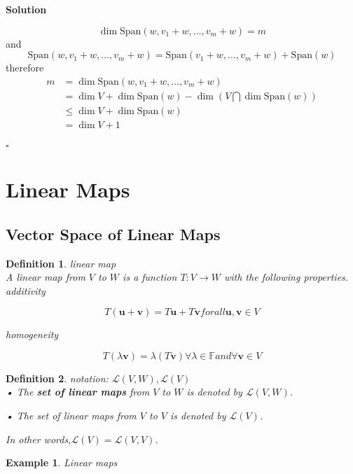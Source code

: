 \documentclass{article}
\newtheorem{example}{Example}[subsection]
\newtheorem{definition}{Definition}[subsection]
\newenvironment{solution}{%
{
    \textbf{Solution\\}
    }
}{
  \hfill $\square$ 
  \par\bigskip 
}
\newcommand{\FF}{\mathbb{F}}
\newcommand{\parameter}[1]{\left(#1\right)}
\newcommand{\ve}{\boldsymbol}
\newcommand{\spans}{\text{Span}}
\begin{document}
\begin{CJK}{UTF8}{gkai}
\begin{solution}
\[\dim \spans(w,v_1 + w,\ldots,v_m + w) = m\]
and
\[\spans(w,v_1 + w,\ldots,v_m + w) = \spans(v_1 + w,\ldots,v_m + w) + \spans(w)\]
therefore
\[
\begin{aligned}  
    m &= \dim \spans(w,v_1 + w,\ldots,v_m + w)\\ 
    &= \dim V + \dim\spans(w) - \dim \parameter{V \bigcap \dim\spans(w)}\\
    &\leq \dim V + \dim\spans(w) \\
    &= \dim V + 1\\
\end{aligned}      
\]
\end{solution}

\section{Linear Maps}

\subsection{Vector Space of Linear Maps}

\begin{definition}
    linear map\\

    A linear map from $V$ to $W$ is a function $T: V \to W$ with the following properties.\\

    additivity

    \[T(\ve{u} +\ve{v} ) = T\ve{u}+T\ve{v} forall \ve{u},\ve{v}  \in V\]

    homogeneity

    \[T(\lambda \ve{v} ) = \lambda (T\ve{v} ) \forall \lambda  \in \FF and \forall \ve{v}  \in V\]
\end{definition}

\begin{definition}
    notation: $\mathcal{L}(V,W), \mathcal{L}(V)$\\

 • The \textbf{set of linear maps} from $V$ to $W$ is denoted by $\mathcal{L}(V,W)$.

 • The set of linear maps from $V$ to $V$ is denoted by $\mathcal{L}(V)$.
 
 In other words,$\mathcal{L}(V) = \mathcal{L}(V,V)$.\\
\end{definition}

\begin{example}
    Linear maps\\


\end{example}
\end{CJK}
\end{document}
